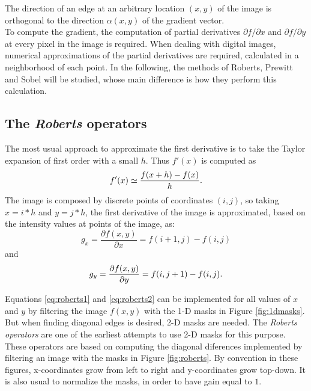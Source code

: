 \documentclass{ipol}
\numberwithin{equation}{section}
\numberwithin{table}{section}
\numberwithin{figure}{section}
\begin{document}
The direction of an edge at an arbitrary location $(x,y)$ of the image is 
orthogonal to the direction $\alpha(x,y)$ of the gradient vector.\\

To compute the gradient, the computation of partial derivatives $\partial f/\partial x$ and $\partial f/\partial y$ 
at every pixel in the image is required. When dealing with digital images, numerical approximations 
of the partial derivatives are required, calculated in a neighborhood of each point. In the following,
the methods of Roberts, Prewitt and Sobel will be studied, whose main difference is how they perform this calculation. 


\subsection{The \textit{Roberts} operators}

The most usual approach to approximate the first derivative is to take the Taylor expansion of first order with
a small $h$. Thus $f'(x)$ is computed as
\begin{equation}
	f'(x) \simeq \frac{f(x+h) - f(x)}{h}.\\
\end{equation}
The image is composed by discrete points of coordinates $(i,j)$, so taking $x=i*h$ and $y=j*h$, the 
first derivative of the image is approximated, based on the intensity values ​​at points of the image, as:
\begin{equation}
\label{eq:roberts1}
	g_x = \frac{\partial f(x,y)}{\partial x} = f(i+1,j) - f(i,j)
\end{equation}
and
\begin{equation}
\label{eq:roberts2}
	g_y = \frac{\partial f(x,y)}{\partial y} = f(i,j+1) - f(i,j).\\
\end{equation}

Equations \ref{eq:roberts1} and \ref{eq:roberts2} can be implemented for all values of $x$ and $y$
by filtering the image $f(x,y)$ with the 1-D masks in Figure \ref{fig:1dmasks}. But when finding 
diagonal edges is desired, 2-D masks are needed. The \textit{Roberts operators} are one of the earliest 
attempts to use 2-D masks for this purpose. These operators are based on computing the diagonal 
diferences implemented by filtering an image with the masks in Figure \ref{fig:roberts}. By convention 
in these figures, x-coordinates grow from left to right and y-coordinates grow top-down. It is also 
usual to normalize the masks, in order to have gain equal to $1$. \\
\end{document}
